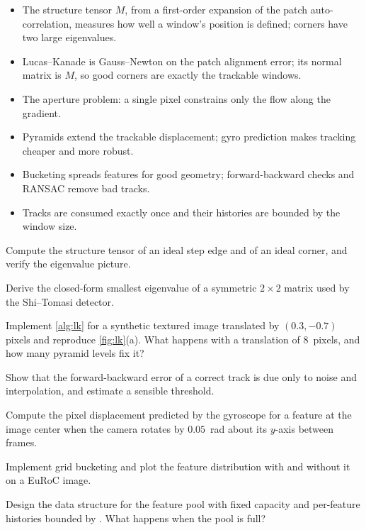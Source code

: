 \begin{takeaways}
\begin{itemize}
  \item The structure tensor $M$, from a first-order expansion of the patch auto-correlation, measures how well a window's position is defined; corners have two
        large eigenvalues.
  \item Lucas--Kanade is Gauss--Newton on the patch alignment error; its normal matrix is $M$, so good corners are exactly the trackable windows.
  \item The aperture problem: a single pixel constrains only the flow along the gradient.
  \item Pyramids extend the trackable displacement; gyro prediction makes tracking cheaper and more robust.
  \item Bucketing spreads features for good geometry; forward-backward checks and RANSAC remove bad tracks.
  \item Tracks are consumed exactly once and their histories are bounded by the window size.
\end{itemize}
\end{takeaways}

\begin{exercises}
  \item Compute the structure tensor of an ideal step edge and of an ideal corner, and verify the eigenvalue picture.
  \item Derive the closed-form smallest eigenvalue of a symmetric $2\times2$ matrix used by the Shi--Tomasi detector.
  \item Implement \cref{alg:lk} for a synthetic textured image translated by $(0.3, -0.7)$ pixels and reproduce \cref{fig:lk}(a). What happens with a translation of
        8~pixels, and how many pyramid levels fix it?
  \item Show that the forward-backward error of a correct track is due only to noise and interpolation, and estimate a sensible threshold.
  \item Compute the pixel displacement predicted by the gyroscope for a feature at the image center when the camera rotates by $0.05$~rad about its $y$-axis between frames.
  \item Implement grid bucketing and plot the feature distribution with and without it on a EuRoC image.
  \item Design the data structure for the feature pool with fixed capacity and per-feature histories bounded by . What happens when the pool is full?
\end{exercises}

